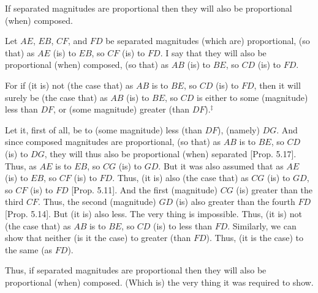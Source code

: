 \begin{Parallel}{}{}
{If separated  magnitudes are proportional  then they will also be proportional (when)
composed.

\epsfysize=0.7in
\centerline{}

Let $AE$, $EB$, $CF$, and $FD$ be separated magnitudes (which are) proportional,
(so that) as $AE$ (is) to $EB$, so  $CF$ (is) to $FD$. I say that they will also be proportional (when)  composed, (so that) as $AB$ (is) to $BE$, so  $CD$ (is) to $FD$.

For if (it is) not (the case that) as $AB$ is to $BE$, so $CD$ (is) to $FD$, then it will
surely be (the case that) as $AB$ (is) to $BE$, so
 $CD$ is either to some (magnitude) less than $DF$, or (some magnitude) greater (than $DF$).$^\ddag$
 
 Let it, first of all, be to (some magnitude) less (than $DF$), (namely) $DG$. And since composed magnitudes are proportional, (so that) as $AB$ is
 to $BE$, so $CD$ (is) to $DG$,  they will  thus also be proportional (when) separated 
 [Prop. 5.17]. Thus, as $AE$ is to $EB$, so
 $CG$ (is) to $GD$. But it was also assumed that as $AE$ (is) to $EB$, so $CF$ (is)
 to $FD$. Thus, (it is) also (the case that) as $CG$ (is) to $GD$, so $CF$ (is) to $FD$ [Prop. 5.11]. And the first (magnitude) $CG$ (is)
 greater than the third $CF$. Thus, the second (magnitude) $GD$ (is)
 also greater than the fourth $FD$ [Prop. 5.14]. 
 But (it is) also less. The very thing is impossible. Thus, (it is) not (the case that) as $AB$ is to $BE$, so $CD$ (is) to less than $FD$. Similarly, we can show
 that neither (is it the case) to greater (than $FD$). Thus, (it is the case) to
 the same (as $FD$).
 
 Thus, if separated  magnitudes are proportional  then they will also be 
 proportional (when)
composed. (Which is) the very thing it was required to show.}
\end{Parallel}


\vspace{7pt}{\footnotesize \noindent$^\dag$ In modern notation, this proposition
reads that if $\alpha:\beta::\gamma:\delta$ then $\alpha+\beta:\beta::
\gamma+\delta:\delta$.}\\


\vspace{7pt}{\footnotesize \noindent$^\ddag$ Here, Euclid assumes, without proof, that
a fourth magnitude proportional to three given magnitudes can always
be found.}

